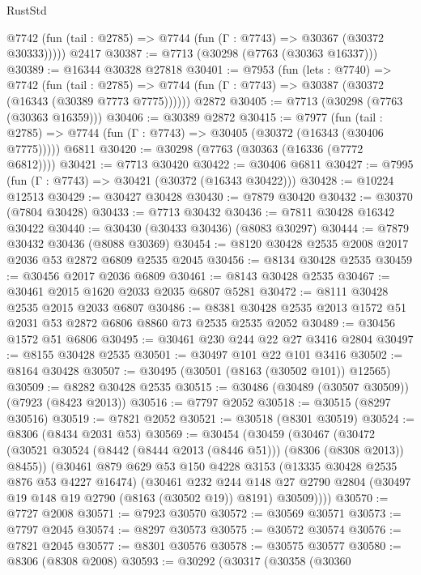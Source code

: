 \begin{lexlean}{RustStd}
\begin{coremodule}
      @7742 (fun (tail : @2785) => @7744 (fun (Γ : @7743) => @30367 (@30372 @30333)))))
    @2417
@30387 := @7713 (@30298 (@7763 (@30363 @16337)))
@30389 := @16344 @30328 @27818
@30401 := @7953
    (fun (lets : @7740) =>
    @7742
      (fun (tail : @2785) =>
      @7744 (fun (Γ : @7743) => @30387 (@30372 (@16343 (@30389 @7773 @7775))))))
    @2872
@30405 := @7713 (@30298 (@7763 (@30363 @16359)))
@30406 := @30389 @2872
@30415 := @7977
    (fun (tail : @2785) => @7744 (fun (Γ : @7743) => @30405 (@30372 (@16343 (@30406 @7775)))))
    @6811
@30420 := @30298 (@7763 (@30363 (@16336 (@7772 @6812))))
@30421 := @7713 @30420
@30422 := @30406 @6811
@30427 := @7995 (fun (Γ : @7743) => @30421 (@30372 (@16343 @30422)))
@30428 := @10224 @12513
@30429 := @30427 @30428
@30430 := @7879 @30420
@30432 := @30370 (@7804 @30428)
@30433 := @7713 @30432
@30436 := @7811 @30428 @16342 @30422
@30440 := @30430 (@30433 @30436) (@8083 @30297)
@30444 := @7879 @30432 @30436 (@8088 @30369)
@30454 := @8120 @30428 @2535 @2008 @2017 @2036 @53 @2872 @6809 @2535 @2045
@30456 := @8134 @30428 @2535
@30459 := @30456 @2017 @2036 @6809
@30461 := @8143 @30428 @2535
@30467 := @30461 @2015 @1620 @2033 @2035 @6807 @5281
@30472 := @8111 @30428 @2535 @2015 @2033 @6807
@30486 := @8381 @30428 @2535 @2013 @1572 @51 @2031 @53 @2872 @6806 @8860 @73 @2535 @2535 @2052
@30489 := @30456 @1572 @51 @6806
@30495 := @30461 @230 @244 @22 @27 @3416 @2804
@30497 := @8155 @30428 @2535
@30501 := @30497 @101 @22 @101 @3416
@30502 := @8164 @30428
@30507 := @30495 (@30501 (@8163 (@30502 @101)) @12565)
@30509 := @8282 @30428 @2535
@30515 := @30486 (@30489 (@30507 @30509)) (@7923 (@8423 @2013))
@30516 := @7797 @2052
@30518 := @30515 (@8297 @30516)
@30519 := @7821 @2052
@30521 := @30518 (@8301 @30519)
@30524 := @8306 (@8434 @2031 @53)
@30569 := @30454
    (@30459
      (@30467
        (@30472 (@30521 @30524 (@8442 (@8444 @2013 (@8446 @51))) (@8306 (@8308 @2013)) @8455))
        (@30461
          @879
          @629
          @53
          @150
          @4228
          @3153
          (@13335 @30428 @2535 @876 @53 @4227 @16474)
          (@30461
            @232
            @244
            @148
            @27
            @2790
            @2804
            (@30497 @19 @148 @19 @2790 (@8163 (@30502 @19)) @8191)
            @30509))))
@30570 := @7727 @2008
@30571 := @7923 @30570
@30572 := @30569 @30571
@30573 := @7797 @2045
@30574 := @8297 @30573
@30575 := @30572 @30574
@30576 := @7821 @2045
@30577 := @8301 @30576
@30578 := @30575 @30577
@30580 := @8306 (@8308 @2008)
@30593 := @30292
    (@30317
      (@30358
        (@30360

\end{coremodule}
\end{lexlean}
